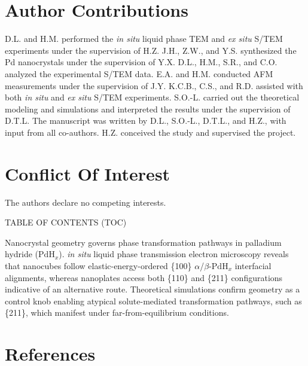 \documentclass[reprint,amsmath,amssymb,aip,nofootinbib, citeautoscript,]{revtex4-2}
\begin{document}
\section*{Author Contributions}

D.L. and H.M. performed the \textit{in situ} liquid phase TEM and \textit{ex situ} S/TEM experiments under the supervision of H.Z. J.H., Z.W., and Y.S. synthesized the Pd nanocrystals under the supervision of Y.X. D.L., H.M., S.R., and C.O. analyzed the experimental S/TEM data. E.A. and H.M. conducted AFM measurements under the supervision of J.Y. K.C.B., C.S., and R.D. assisted with both \textit{in situ} and \textit{ex situ} S/TEM experiments. S.O.-L. carried out the theoretical modeling and simulations and interpreted the results under the supervision of D.T.L. The manuscript was written by D.L., S.O.-L., D.T.L., and H.Z., with input from all co-authors. H.Z. conceived the study and supervised the project.


\section*{Conflict Of Interest}

The authors declare no competing interests.


TABLE OF CONTENTS (TOC)


Nanocrystal geometry governs phase transformation pathways in palladium hydride ($\mathrm{PdH}_x$). \textit{in situ} liquid phase transmission electron microscopy reveals that nanocubes follow elastic-energy-ordered \{100\} $\alpha$/$\beta$-$\mathrm{PdH}_x$ interfacial alignments, whereas nanoplates access both \{110\} and \{211\} configurations indicative of an alternative route. Theoretical simulations confirm geometry as a control knob enabling atypical solute-mediated transformation pathways, such as \{211\}, which manifest under far-from-equilibrium conditions.


\section*{References}
\end{document}

